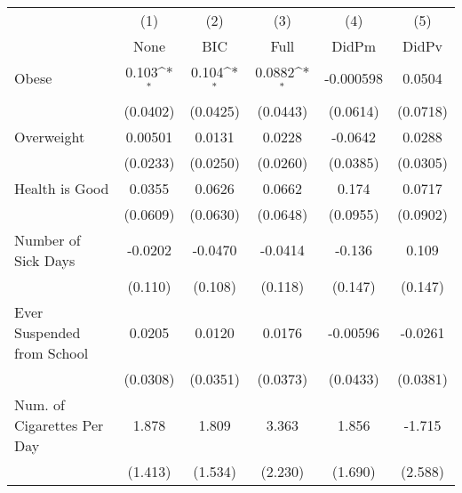 {
\def\sym#1{\ifmmode^{#1}\else\(^{#1}\)\fi}
\begin{tabular}{l*{5}{c}}
\toprule
            &\multicolumn{1}{c}{(1)}&\multicolumn{1}{c}{(2)}&\multicolumn{1}{c}{(3)}&\multicolumn{1}{c}{(4)}&\multicolumn{1}{c}{(5)}\\
            &\multicolumn{1}{c}{None}&\multicolumn{1}{c}{BIC}&\multicolumn{1}{c}{Full}&\multicolumn{1}{c}{DidPm}&\multicolumn{1}{c}{DidPv}\\
\midrule
Obese       &       0.103\sym{*}  &       0.104\sym{*}  &      0.0882\sym{*}  &   -0.000598         &      0.0504         \\
            &    (0.0402)         &    (0.0425)         &    (0.0443)         &    (0.0614)         &    (0.0718)         \\
\addlinespace
Overweight  &     0.00501         &      0.0131         &      0.0228         &     -0.0642         &      0.0288         \\
            &    (0.0233)         &    (0.0250)         &    (0.0260)         &    (0.0385)         &    (0.0305)         \\
\addlinespace
Health is Good&      0.0355         &      0.0626         &      0.0662         &       0.174         &      0.0717         \\
            &    (0.0609)         &    (0.0630)         &    (0.0648)         &    (0.0955)         &    (0.0902)         \\
\addlinespace
Number of Sick Days&     -0.0202         &     -0.0470         &     -0.0414         &      -0.136         &       0.109         \\
            &     (0.110)         &     (0.108)         &     (0.118)         &     (0.147)         &     (0.147)         \\
\addlinespace
Ever Suspended from School&      0.0205         &      0.0120         &      0.0176         &    -0.00596         &     -0.0261         \\
            &    (0.0308)         &    (0.0351)         &    (0.0373)         &    (0.0433)         &    (0.0381)         \\
\addlinespace
Num. of Cigarettes Per Day&       1.878         &       1.809         &       3.363         &       1.856         &      -1.715         \\
            &     (1.413)         &     (1.534)         &     (2.230)         &     (1.690)         &     (2.588)         \\
\bottomrule
\end{tabular}
}
